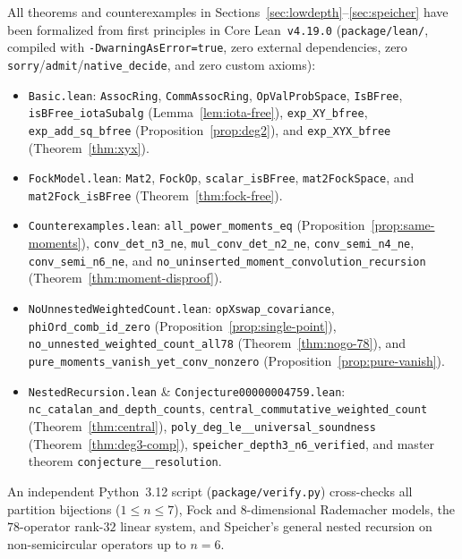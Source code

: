 \documentclass[11pt,a4paper]{article}
\theoremstyle{definition}
\begin{document}
All theorems and counterexamples in Sections~\ref{sec:lowdepth}--\ref{sec:speicher} have been formalized from first principles in Core Lean~\texttt{v4.19.0} (\texttt{package/lean/}, compiled with \texttt{-DwarningAsError=true}, zero external dependencies, zero \texttt{sorry}/\texttt{admit}/\texttt{native\_decide}, and zero custom axioms):
{\raggedright
\begin{itemize}
\item \texttt{Basic.lean}: \texttt{AssocRing}, \texttt{CommAssocRing}, \texttt{OpValProbSpace}, \texttt{IsBFree}, \texttt{isBFree\_\allowbreak iotaSubalg} (Lemma~\ref{lem:iota-free}), \texttt{exp\_\allowbreak XY\_\allowbreak bfree}, \texttt{exp\_\allowbreak add\_\allowbreak sq\_\allowbreak bfree} (Proposition~\ref{prop:deg2}), and \texttt{exp\_\allowbreak XYX\_\allowbreak bfree} (Theorem~\ref{thm:xyx}).
\item \texttt{FockModel.lean}: \texttt{Mat2}, \texttt{FockOp}, \texttt{scalar\_\allowbreak isBFree}, \texttt{mat2FockSpace}, and \texttt{mat2Fock\_\allowbreak isBFree} (Theorem~\ref{thm:fock-free}).
\item \texttt{Counterexamples.lean}: \texttt{all\_\allowbreak power\_\allowbreak moments\_\allowbreak eq} (Proposition~\ref{prop:same-moments}), \texttt{conv\_\allowbreak det\_\allowbreak n3\_\allowbreak ne}, \texttt{mul\_\allowbreak conv\_\allowbreak det\_\allowbreak n2\_\allowbreak ne}, \texttt{conv\_\allowbreak semi\_\allowbreak n4\_\allowbreak ne}, \texttt{conv\_\allowbreak semi\_\allowbreak n6\_\allowbreak ne}, and \texttt{no\_\allowbreak uninserted\_\allowbreak moment\_\allowbreak convolution\_\allowbreak recursion} (Theorem~\ref{thm:moment-disproof}).
\item \texttt{NoUnnestedWeightedCount.lean}: \texttt{opXswap\_\allowbreak covariance}, \texttt{phiOrd\_\allowbreak comb\_\allowbreak id\_\allowbreak zero} (Proposition~\ref{prop:single-point}), \texttt{no\_\allowbreak unnested\_\allowbreak weighted\_\allowbreak count\_\allowbreak all78} (Theorem~\ref{thm:nogo-78}), and \texttt{pure\_\allowbreak moments\_\allowbreak vanish\_\allowbreak yet\_\allowbreak conv\_\allowbreak nonzero} (Proposition~\ref{prop:pure-vanish}).
\item \texttt{NestedRecursion.lean} \& \texttt{Conjecture00000004759.lean}: \texttt{nc\_\allowbreak catalan\_\allowbreak and\_\allowbreak depth\_\allowbreak counts}, \texttt{central\_\allowbreak commutative\_\allowbreak weighted\_\allowbreak count} (Theorem~\ref{thm:central}), \texttt{poly\_\allowbreak deg\_\allowbreak le\_\_\allowbreak universal\_\allowbreak soundness} (Theorem~\ref{thm:deg3-comp}), \texttt{speicher\_\allowbreak depth3\_\allowbreak n6\_\allowbreak verified}, and master theorem \texttt{conjecture\_\_\allowbreak resolution}.
\end{itemize}
}
An independent Python~3.12 script (\texttt{package/verify.py}) cross-checks all partition bijections ($1 \le n \le 7$), Fock and $8$-dimensional Rademacher models, the $78$-operator rank-$32$ linear system, and Speicher's general nested recursion on non-semicircular operators up to $n = 6$.
\end{document}
